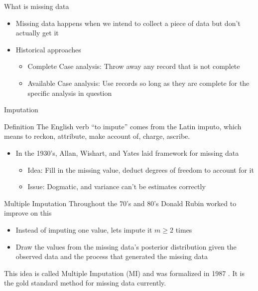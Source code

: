 \begin{frame}{What is missing data}
 \begin{itemize}
 \item Missing data happens when we intend to collect a piece of data but don't actually get it
 \item Historical approaches
 \begin{itemize}
  \item Complete Case analysis: Throw away any record that is not complete
 \item Available Case analysis: Use records so long as they are complete for the specific analysis in question
 \end{itemize}
 \end{itemize}
 
\end{frame}


\begin{frame}{Imputation}
\begin{block}{Definition}
The English verb ``to impute'' comes from the Latin imputo, which means
to reckon, attribute, make account of, charge, ascribe. \cite{VanBuuren2012}
\end{block}
\begin{itemize}
 \item In the 1930's, Allan, Wishart, and Yates laid framework for missing data
 \begin{itemize}
  \item Idea: Fill in the missing value, deduct degrees of freedom to account for it
  \item Issue: Dogmatic, and variance can't be estimates correctly
 \end{itemize}

\end{itemize}

 
\end{frame}

\begin{frame}{Multiple Imputation}
Throughout the 70's and 80's Donald Rubin worked to improve on this
\begin{itemize}
 \item Instead of imputing one value, lets impute it $m\geq 2$ times
 \item Draw the values from the missing data's posterior distribution given the observed
 data and the process that generated the missing data
\end{itemize}
This idea is called Multiple Imputation (MI) and was formalized in 1987 \cite{Rubin1987}. It is the gold standard method
for missing data currently.


\end{frame}


